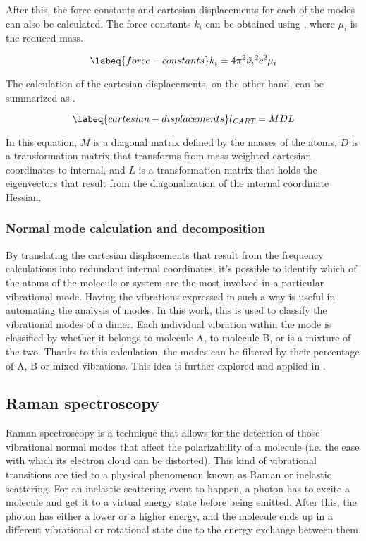 After this, the force constants and cartesian displacements for each of the modes can also be calculated.
The force constants $k_i$ can be obtained using , where $\mu_i$ is the reduced mass.

\begin{equation}
    \labeq{force-constants}
    k_i =  4 \pi^2 \tilde{\nu_i}^2 c^2 \mu_i
\end{equation}

The calculation of the cartesian displacements, on the other hand, can be summarized as .

\begin{equation}
    \labeq{cartesian-displacements}
    l_\textit{CART} = MDL
\end{equation}

In this equation, $M$ is a diagonal matrix defined by the masses of the atoms, $D$ is a transformation matrix that transforms from mass weighted cartesian coordinates to internal, and $L$ is a transformation matrix that holds the eigenvectors that result from the diagonalization of the internal coordinate Hessian.

\subsubsection{Normal mode calculation and decomposition}
By translating the cartesian displacements that result from the frequency calculations into redundant internal coordinates, it's possible to identify which of the atoms of the molecule or system are the most involved in a particular vibrational mode.
Having the vibrations expressed in such a way is useful in automating the analysis of modes.
In this work, this is used to classify the vibrational modes of a dimer.
Each individual vibration within the mode is classified by whether it belongs to molecule A, to molecule B, or is a mixture of the two.
Thanks to this calculation, the modes can be filtered by their percentage of A, B or mixed vibrations.
This idea is further explored and applied in .

\subsection{Raman spectroscopy}
Raman spectroscopy is a technique that allows for the detection of those vibrational normal modes that affect the polarizability of a molecule (i.e. the ease with which its electron cloud can be distorted).
This kind of vibrational transitions are tied to a physical phenomenon known as Raman or inelastic scattering.
For an inelastic scattering event to happen, a photon has to excite a molecule and get it to a virtual energy state before being emitted.
After this, the photon has either a lower or a higher energy, and the molecule ends up in a different vibrational or rotational state due to the energy exchange between them.

